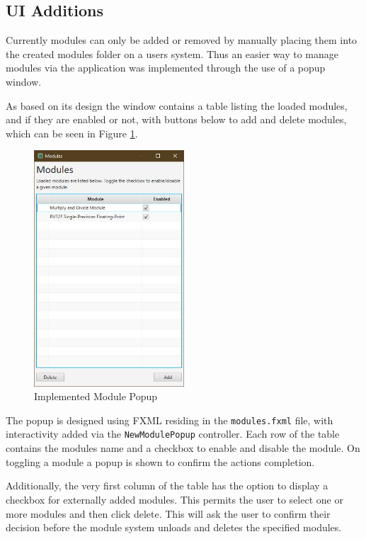 \subsection{\ac{UI} Additions}
Currently modules can only be added or removed by manually placing them into the created modules folder on a users system. Thus an easier way to manage modules via the application was implemented through the use of a popup window.

As based on its design the window contains a table listing the loaded modules, and if they are enabled or not, with buttons below to add and delete modules, which can be seen in Figure \ref{fig:module_popup_imp}.

\begin{figure}[H]
    \centering
    \includegraphics[width=0.5\textwidth]{dissertation/DATA/module_popup.jpg}
    \caption{Implemented Module Popup}
    \label{fig:module_popup_imp}
\end{figure}

The popup is designed using FXML residing in the \texttt{modules.fxml} file, with interactivity added via the \texttt{NewModulePopup} controller. Each row of the table contains the modules name and a checkbox to enable and disable the module. On toggling a module a popup is shown to confirm the actions completion.

Additionally, the very first column of the table has the option to display a checkbox for externally added modules. This permits the user to select one or more modules and then click delete. This will ask the user to confirm their decision before the module system unloads and deletes the specified modules.


